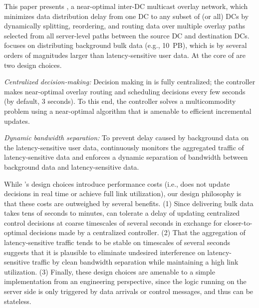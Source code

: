 This paper presents {\em \name}, a near-optimal inter-DC multicast
overlay network, which minimizes data distribution delay from one
DC to any subset of (or all) DCs by dynamically splitting,
reordering, and routing data over multiple overlay paths selected
from all server-level paths between the source DC and destination DCs.
\name focuses on distributing background bulk data (e.g., 10~PB),
which is by several orders of magnitudes larger than
latency-sensitive user data.
At the core of \name are two design choices.
\begin{packeditemize}
\item {\em Centralized decision-making:}
Decision making in \name is fully centralized; the \name controller
makes near-optimal overlay routing and scheduling decisions every
few seconds (by default, 3 seconds).
To this end, the controller solves a multicommodity problem using
a near-optimal algorithm that is amenable to efficient incremental
updates.
\item {\em Dynamic bandwidth separation:}
To prevent delay caused by background data on the
latency-sensitive user data, \name continuously monitors the
aggregated traffic
of latency-sensitive data and enforces a dynamic  separation of
bandwidth between background data and latency-sensitive data.
\end{packeditemize}


While \name's design choices introduce performance costs (i.e.,
\name does not update decisions in real time or achieve full
link utilization), our design philosophy is that these costs are
outweighed by several benefits.
(1) Since delivering bulk data takes tens of seconds to
minutes, \name can tolerate a delay of updating centralized
control decisions at coarse timescales of several
seconds in exchange for closer-to-optimal decisions made by a
centralized controller.
(2) That the aggregation of latency-sensitive traffic tends to
be stable on timescales of several seconds suggests that it is
plausible to eliminate undesired interference on
latency-sensitive traffic by clean bandwidth separation
while maintaining a high link utilization.
(3) Finally, these design choices are amenable to a simple
implementation from an engineering perspective,
since the logic running on the server side is
only triggered by data arrivals or control messages, and
thus can be stateless.



